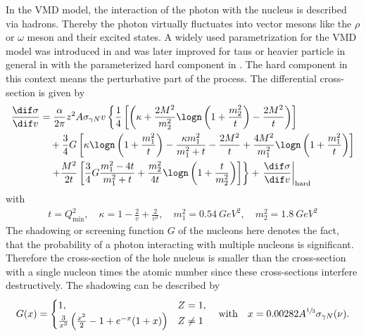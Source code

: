 In the VMD model, the interaction of the photon with the nucleus is described via hadrons.
Thereby the photon virtually fluctuates into vector mesons like the $\rho$ or $\omega$ meson and their excited states.
A widely used parametrization for the VMD model was introduced in \cite{Bezrukov80, Bezrukov81} and was later improved for taus or heavier particle in general in \cite{Bugaev03HardComponent} with the parameterized hard component in \cite{Bugaev04HardComponent}.
The hard component in this context means the perturbative part of the process.
The differential cross-section is given by
\begin{equation} \label{eq:photo_dsigma_vmd}
    \begin{aligned}
    \frac{\dif \sigma}{\dif v} &=
        \frac{\alpha}{2\pi} z^2 A \sigma_{\gamma N} v %
        \left\{
            \frac14 \left[ \left( \kappa + \frac{2 M^2}{m_2^2} \logn \left( 1 + \frac{m_2^2}{t} \right) - \frac{2 M^2}{t} \right) \right] \right. \\
        & \quad
            + \frac34 G \left[ \kappa \logn \left( 1 + \frac{m_1^2}{t} \right) - \frac{\kappa m_1^2}{m_1^2 + t} - \frac{2 M^2}{t} + \frac{4 M^2}{m_1^2} \logn \left(1 + \frac{m_1^2}{t} \right) \right] \\
        & \quad
        \left.
            + \frac{M^2}{2t} \left[ \frac34 G \frac{m_1^2 - 4t}{m_1^2 + t} + \frac{m_2^2}{4t} \logn \left( 1 + \frac{t}{m_2^2} \right) \right]
        \right\} + 
        \left. \frac{\dif \sigma}{\dif v} \right|_{\text{hard}}
    \end{aligned}
\end{equation}
with
\begin{align}
    t = Q_{\text{min}}^2,
    \quad
    \kappa = 1 - \frac2v + \frac{2}{v^2},
    \quad
    m_1^2 = \SI{0.54}{GeV^2},
    \quad
    m_2^2 = \SI{1.8}{GeV^2}
\end{align}
The shadowing or screening function $G$ of the nucleons here denotes the fact, that the probability of a photon interacting with multiple nucleons is significant.
Therefore the cross-section of the hole nucleus is smaller than the cross-section with a single nucleon times the atomic number since these cross-sections interfere destructively.
The shadowing can be described by \cite{Bezrukov81}
\begin{align}
    G(x) = 
    \begin{cases}
        1, & Z = 1, \\
        \frac{3}{x^3} \left( \frac{x^2}{2} - 1 + e^{-x}(1 + x) \right) & Z \neq 1
    \end{cases}
    \quad \text{with} \quad
    x = 0.00282 A^{\sfrac13} \sigma_{\gamma N}(\nu) .
\end{align}
